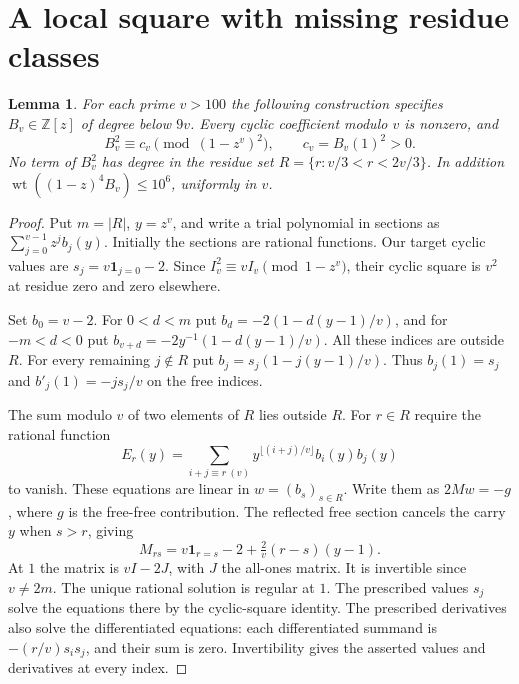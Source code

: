 \documentclass[11pt]{article}
\newcommand{\wt}{\operatorname{wt}}
\newcommand{\Z}{\mathbb Z}
\newtheorem{lemma}[theorem]{Lemma}
\begin{document}
\section{A local square with missing residue classes}
\begin{lemma}\label{local}
For each prime $v>100$ the following construction specifies $B_v\in\Z[z]$ of degree below $9v$. Every cyclic coefficient modulo $v$ is nonzero, and
\[
 B_v^2\equiv c_v\pmod{(1-z^v)^2},\qquad c_v=B_v(1)^2>0.
\]
No term of $B_v^2$ has degree in the residue set $R=\{r:v/3<r<2v/3\}$. In addition $\wt((1-z)^4B_v)\leq 10^6$, uniformly in $v$.
\end{lemma}
\begin{proof}
Put $m=|R|$, $y=z^v$, and write a trial polynomial in sections as $\sum_{j=0}^{v-1}z^j b_j(y)$. Initially the sections are rational functions. Our target cyclic values are $s_j=v\mathbf1_{j=0}-2$. Since $I_v^2\equiv v I_v\pmod{1-z^v}$, their cyclic square is $v^2$ at residue zero and zero elsewhere.

Set $b_0=v-2$. For $0<d<m$ put $b_d=-2(1-d(y-1)/v)$, and for $-m<d<0$ put $b_{v+d}=-2y^{-1}(1-d(y-1)/v)$. All these indices are outside $R$. For every remaining $j\notin R$ put $b_j=s_j(1-j(y-1)/v)$. Thus $b_j(1)=s_j$ and $b'_j(1)=-js_j/v$ on the free indices.

The sum modulo $v$ of two elements of $R$ lies outside $R$. For $r\in R$ require the rational function
\[
 E_r(y)=\sum_{i+j\equiv r\ (v)}y^{\lfloor(i+j)/v\rfloor}b_i(y)b_j(y)
\]
to vanish. These equations are linear in $w=(b_s)_{s\in R}$. Write them as $2Mw=-g$, where $g$ is the free-free contribution. The reflected free section cancels the carry $y$ when $s>r$, giving
\[
 M_{rs}=v\mathbf1_{r=s}-2+\tfrac2v(r-s)(y-1).
\]
At $1$ the matrix is $vI-2J$, with $J$ the all-ones matrix. It is invertible since $v\ne 2m$. The unique rational solution is regular at $1$. The prescribed values $s_j$ solve the equations there by the cyclic-square identity. The prescribed derivatives also solve the differentiated equations: each differentiated summand is $-(r/v)s_i s_j$, and their sum is zero. Invertibility gives the asserted values and derivatives at every index.


\end{proof}
\end{document}
